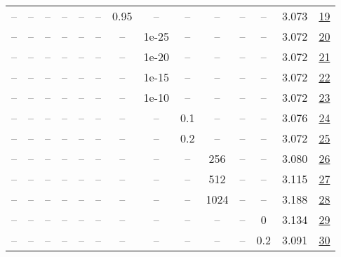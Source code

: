 \begin{table}[H]
\begin{tabular}{cccccccccccccc}
-- & -- & -- & -- & -- & -- & 0.95 & -- & -- & -- & -- & -- & 3.073 & \href{https://wandb.ai/stanford-mercury/optimizer-scaling/runs/sweep-520m-10B-muon6f490clr0.008-wd0.1-minlr0-warmup0-b10.8-b20.-59ba2a}{19} \\
-- & -- & -- & -- & -- & -- & -- & 1e-25 & -- & -- & -- & -- & 3.072 & \href{https://wandb.ai/stanford-mercury/optimizer-scaling/runs/sweep-520m-10B-muon72cb00lr0.008-wd0.1-minlr0-warmup0-b10.8-b20.-700a79}{20} \\
-- & -- & -- & -- & -- & -- & -- & 1e-20 & -- & -- & -- & -- & 3.072 & \href{https://wandb.ai/stanford-mercury/optimizer-scaling/runs/sweep-520m-10B-muon3db195lr0.008-wd0.1-minlr0-warmup0-b10.8-b20.-ceaf52}{21} \\
-- & -- & -- & -- & -- & -- & -- & 1e-15 & -- & -- & -- & -- & 3.072 & \href{https://wandb.ai/stanford-mercury/optimizer-scaling/runs/sweep-520m-10B-muon83b024lr0.008-wd0.1-minlr0-warmup0-b10.8-b20.-06e1cd}{22} \\
-- & -- & -- & -- & -- & -- & -- & 1e-10 & -- & -- & -- & -- & 3.072 & \href{https://wandb.ai/stanford-mercury/optimizer-scaling/runs/sweep-520m-10B-muonc83f11lr0.008-wd0.1-minlr0-warmup0-b10.8-b20.-b70e12}{23} \\
-- & -- & -- & -- & -- & -- & -- & -- & 0.1 & -- & -- & -- & 3.076 & \href{https://wandb.ai/stanford-mercury/optimizer-scaling/runs/sweep-520m-10B-muoned1be6lr0.008-wd0.1-minlr0-warmup0-b10.8-b20.-472a68}{24} \\
-- & -- & -- & -- & -- & -- & -- & -- & 0.2 & -- & -- & -- & 3.072 & \href{https://wandb.ai/stanford-mercury/optimizer-scaling/runs/sweep-520m-10B-muoncab636lr0.008-wd0.1-minlr0-warmup0-b10.8-b20.-df4920}{25} \\
-- & -- & -- & -- & -- & -- & -- & -- & -- & 256 & -- & -- & 3.080 & \href{https://wandb.ai/stanford-mercury/optimizer-scaling/runs/sweep-520m-10B-muona62a25lr0.008-wd0.1-minlr0-warmup0-b10.8-b20.-97f566}{26} \\
-- & -- & -- & -- & -- & -- & -- & -- & -- & 512 & -- & -- & 3.115 & \href{https://wandb.ai/stanford-mercury/optimizer-scaling/runs/sweep-520m-10B-muon3fa686lr0.008-wd0.1-minlr0-warmup0-b10.8-b20.-2400de}{27} \\
-- & -- & -- & -- & -- & -- & -- & -- & -- & 1024 & -- & -- & 3.188 & \href{https://wandb.ai/stanford-mercury/optimizer-scaling/runs/sweep-520m-10B-muon1aeff4lr0.008-wd0.1-minlr0-warmup0-b10.8-b20.-7d6c1a}{28} \\
-- & -- & -- & -- & -- & -- & -- & -- & -- & -- & -- & 0 & 3.134 & \href{https://wandb.ai/stanford-mercury/optimizer-scaling/runs/sweep-520m-10B-muonde6262lr0.008-wd0-minlr0-warmup0-b10.8-b20.98-beffd0}{29} \\
-- & -- & -- & -- & -- & -- & -- & -- & -- & -- & -- & 0.2 & 3.091 & \href{https://wandb.ai/stanford-mercury/optimizer-scaling/runs/sweep-520m-10B-muon3e335flr0.008-wd0.2-minlr0-warmup0-b10.8-b20.-b2ac88}{30} \\
\bottomrule
\end{tabular}
\end{table}

